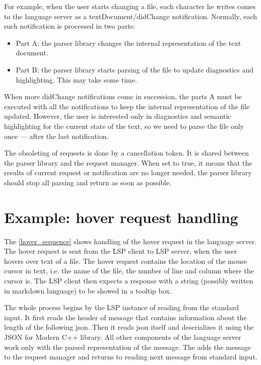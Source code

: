 For example, when the user starts changing a file, each character he writes comes to the language server as a textDocument/didChange notification. Normally, each such notification is processed in two parts:
\begin{itemize}
	\item Part A: the parser library changes the internal representation of the text document.
	\item Part B: the parser library starts parsing of the file to update diagnostics and highlighting. This may take some time.
\end{itemize}
When more didChange notifications come in succession, the parts A must be executed with all the notifications to keep the internal representation of the file updated. However, the user is interested only in diagnostics and semantic highlighting for the current state of the text, so we need to parse the file only once --- after the last notification.

The obsoleting of requests is done by a cancellation token. It is shared between the parser library and the request manager. When set to true, it means that the results of current request or notification are no longer needed, the parser library should stop all parsing and return as soon as possible.

\section{Example: hover request handling}

The \cref{hover_sequence} shows handling of the hover request in the language server. The hover request is sent from the LSP client to LSP server, when the user hovers over text of a file. The hover request contains the location of the mouse cursor in text, i.e. the name of the file, the number of line and column where the cursor is. The LSP client then expects a response with a string (possibly written in markdown language) to be showed in a tooltip box.

The whole process begins by the LSP instance of  reading from the standard input. It first reads the header of message that contains information about the length of the following json. Then it reads json itself and deserializes it using the JSON for Modern C++ library. All other components of the language server work only with the parsed representation of the message. The  adds the message to the request manager and returns to reading next message from standard input.

